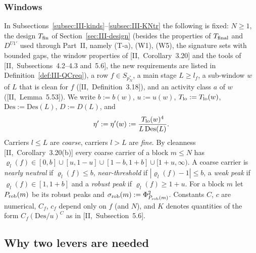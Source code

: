 \documentclass[10pt]{amsart}
\theoremstyle{definition}
\theoremstyle{remark}
\begin{document}
\subsubsection*{Windows}
In Subsections~\ref{subsec:III-kinds}--\ref{subsec:III-KNtr} the following
is fixed: $N\ge1$, the design $T_{\rm fin}$ of
Section~\ref{sec:III-design} (besides the properties of $T_{\rm final}$
and $D^{U1'}$ used through Part~II, namely (T-a), (W1), (W5), the
signature sets with bounded gaps, the window properties of
[II,~Corollary~3.20] and the tools of [II,~Subsections~4.2--4.3
and~5.6], the new requirements are listed in
Definition~\ref{def:III-QCreq}), a row $f\in S_{p_N^*}$, a main stage
$L\ge l_f$, a sub-window $w$ of $L$ that is clean for $f$
([II,~Definition~3.18]), and an activity class $a$ of $w$
([II,~Lemma~5.53]).  We write $b:=b(w)$, $u:=u(w)$, $T_{\rm lo}:=T_{\rm lo}(w)$,
$\mathrm{Des}:=\mathrm{Des}(L)$, $D:=D(L)$, and
\[
 \eta':=\eta'(w):=\frac{T_{\rm lo}(w)^4}{L\,\mathrm{Des}(L)} .
\]
Carriers $l\le L$ are \emph{coarse}, carriers $l>L$ are \emph{fine}.  By
cleanness [II,~Corollary~3.20(b)] every coarse carrier of a block $m\le N$
has $\varrho_l(f)\in[0,b]\cup[u,1-u]\cup[1-b,1+b]\cup[1+u,\infty)$.  A coarse
carrier is \emph{nearly neutral} if $\varrho_l(f)\le b$, \emph{near-threshold}
if $|\varrho_l(f)-1|\le b$, a \emph{weak peak} if $\varrho_l(f)\in[1,1+b]$ and
a \emph{robust peak} if $\varrho_l(f)\ge1+u$.  For a block $m$ let
$P_{\rm rob}(m)$ be its robust peaks and $\sigma_{\rm rob}(m):=
\Phi_{P_{\rm rob}(m)}^2$.  Constants $C$, $c$ are numerical, $C_f$, $c_f$
depend only on $f$ (and $N$), and $K$ denotes quantities of the form
$C_f(\mathrm{Des}/u)^C$ as in [II,~Subsection~5.6].

\subsection{Why two levers are needed}\label{subsec:III-twolevers}
\end{document}
